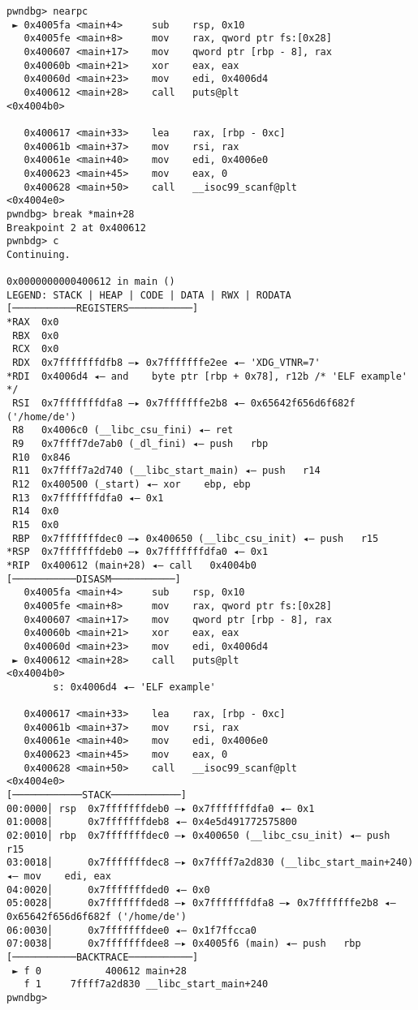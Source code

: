 \documentclass{article}
\begin{document}
\begin{lstlisting}
pwndbg> nearpc
 ► 0x4005fa <main+4>     sub    rsp, 0x10
   0x4005fe <main+8>     mov    rax, qword ptr fs:[0x28]
   0x400607 <main+17>    mov    qword ptr [rbp - 8], rax
   0x40060b <main+21>    xor    eax, eax
   0x40060d <main+23>    mov    edi, 0x4006d4
   0x400612 <main+28>    call   puts@plt                      <0x4004b0>
 
   0x400617 <main+33>    lea    rax, [rbp - 0xc]
   0x40061b <main+37>    mov    rsi, rax
   0x40061e <main+40>    mov    edi, 0x4006e0
   0x400623 <main+45>    mov    eax, 0
   0x400628 <main+50>    call   __isoc99_scanf@plt            <0x4004e0>
pwndbg> break *main+28
Breakpoint 2 at 0x400612
pwnbdg> c
Continuing.

0x0000000000400612 in main ()
LEGEND: STACK | HEAP | CODE | DATA | RWX | RODATA
[───────────REGISTERS───────────]
*RAX  0x0
 RBX  0x0
 RCX  0x0
 RDX  0x7fffffffdfb8 —▸ 0x7fffffffe2ee ◂— 'XDG_VTNR=7'
*RDI  0x4006d4 ◂— and    byte ptr [rbp + 0x78], r12b /* 'ELF example' */
 RSI  0x7fffffffdfa8 —▸ 0x7fffffffe2b8 ◂— 0x65642f656d6f682f ('/home/de')
 R8   0x4006c0 (__libc_csu_fini) ◂— ret    
 R9   0x7ffff7de7ab0 (_dl_fini) ◂— push   rbp
 R10  0x846
 R11  0x7ffff7a2d740 (__libc_start_main) ◂— push   r14
 R12  0x400500 (_start) ◂— xor    ebp, ebp
 R13  0x7fffffffdfa0 ◂— 0x1
 R14  0x0
 R15  0x0
 RBP  0x7fffffffdec0 —▸ 0x400650 (__libc_csu_init) ◂— push   r15
*RSP  0x7fffffffdeb0 —▸ 0x7fffffffdfa0 ◂— 0x1
*RIP  0x400612 (main+28) ◂— call   0x4004b0
[───────────DISASM───────────]
   0x4005fa <main+4>     sub    rsp, 0x10
   0x4005fe <main+8>     mov    rax, qword ptr fs:[0x28]
   0x400607 <main+17>    mov    qword ptr [rbp - 8], rax
   0x40060b <main+21>    xor    eax, eax
   0x40060d <main+23>    mov    edi, 0x4006d4
 ► 0x400612 <main+28>    call   puts@plt                      <0x4004b0>
        s: 0x4006d4 ◂— 'ELF example'
 
   0x400617 <main+33>    lea    rax, [rbp - 0xc]
   0x40061b <main+37>    mov    rsi, rax
   0x40061e <main+40>    mov    edi, 0x4006e0
   0x400623 <main+45>    mov    eax, 0
   0x400628 <main+50>    call   __isoc99_scanf@plt            <0x4004e0>
[────────────STACK────────────]
00:0000│ rsp  0x7fffffffdeb0 —▸ 0x7fffffffdfa0 ◂— 0x1
01:0008│      0x7fffffffdeb8 ◂— 0x4e5d491772575800
02:0010│ rbp  0x7fffffffdec0 —▸ 0x400650 (__libc_csu_init) ◂— push   r15
03:0018│      0x7fffffffdec8 —▸ 0x7ffff7a2d830 (__libc_start_main+240) ◂— mov    edi, eax
04:0020│      0x7fffffffded0 ◂— 0x0
05:0028│      0x7fffffffded8 —▸ 0x7fffffffdfa8 —▸ 0x7fffffffe2b8 ◂— 0x65642f656d6f682f ('/home/de')
06:0030│      0x7fffffffdee0 ◂— 0x1f7ffcca0
07:0038│      0x7fffffffdee8 —▸ 0x4005f6 (main) ◂— push   rbp
[───────────BACKTRACE───────────]
 ► f 0           400612 main+28
   f 1     7ffff7a2d830 __libc_start_main+240
pwndbg> 
\end{lstlisting}
\end{document}
